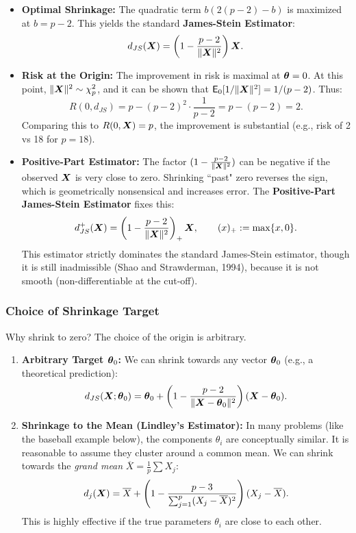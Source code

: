 \begin{itemize}
    \item \textbf{Optimal Shrinkage:} The quadratic term $b(2(p-2) - b)$ is maximized at $b = p-2$. This yields the standard \textbf{James-Stein Estimator}:
    \[
    d_{JS}(\boldsymbol{X}) = \left(1 - \frac{p-2}{\|\boldsymbol{X}\|^2}\right)\boldsymbol{X}.
    \]
    
    \item \textbf{Risk at the Origin:} The improvement in risk is maximal at $\boldsymbol{\theta} = 0$. At this point, $\|\boldsymbol{X}\|^2 \sim \chi^2_p$, and it can be shown that $\mathsf{E}_0[1/\|\boldsymbol{X}\|^2] = 1/(p-2)$. Thus:
    \[
    R(0, d_{JS}) = p - (p-2)^2 \cdot \frac{1}{p-2} = p - (p-2) = 2.
    \]
    Comparing this to $R(0, \boldsymbol{X}) = p$, the improvement is substantial (e.g., risk of 2 vs 18 for $p=18$).
    
    \item \textbf{Positive-Part Estimator:} The factor $(1 - \frac{p-2}{\|\boldsymbol{X}\|^2})$ can be negative if the observed $\boldsymbol{X}$ is very close to zero. Shrinking ``past" zero reverses the sign, which is geometrically nonsensical and increases error. The \textbf{Positive-Part James-Stein Estimator} fixes this:
    \[
    d_{JS}^+(\boldsymbol{X}) = \left(1 - \frac{p-2}{\|\boldsymbol{X}\|^2}\right)_+ \boldsymbol{X}, \qquad (x)_+ := \max\{x, 0\}.
    \]
    This estimator strictly dominates the standard James-Stein estimator, though it is still inadmissible (Shao and Strawderman, 1994), because it is not smooth (non-differentiable at the cut-off).
\end{itemize}

\subsubsection{Choice of Shrinkage Target}

Why shrink to zero? The choice of the origin is arbitrary.
\begin{enumerate}
    \item \textbf{Arbitrary Target $\boldsymbol{\theta}_0$:} We can shrink towards any vector $\boldsymbol{\theta}_0$ (e.g., a theoretical prediction):
    \[
    d_{JS}(\boldsymbol{X}; \boldsymbol{\theta}_0) = \boldsymbol{\theta}_0 + \left(1 - \frac{p-2}{\|\boldsymbol{X} - \boldsymbol{\theta}_0\|^2}\right)(\boldsymbol{X} - \boldsymbol{\theta}_0).
    \]
    \item \textbf{Shrinkage to the Mean (Lindley's Estimator):} In many problems (like the baseball example below), the components $\theta_i$ are conceptually similar. It is reasonable to assume they cluster around a common mean. We can shrink towards the \textit{grand mean} $\overline{X} = \frac{1}{p}\sum X_j$:
    \[
    d_j(\boldsymbol{X}) = \overline{X} + \left(1 - \frac{p-3}{\sum_{j=1}^p (X_j - \overline{X})^2}\right)(X_j - \overline{X}).
    \]
    This is highly effective if the true parameters $\theta_i$ are close to each other.
\end{enumerate}


